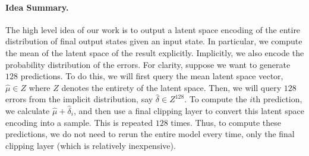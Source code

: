 \documentclass{article}
\begin{document}
\paragraph{Idea Summary.}
The high level idea of our work is to output a latent space encoding of the entire distribution of final output states given an input state. In particular, we compute the mean of the latent space of the result explicitly. Implicitly, we also encode the probability distribution of the errors. For clarity, suppose we want to generate $128$ predictions. To do this, we will first query the mean latent space vector, $\hat{\mu} \in Z$ where $Z$ denotes the entirety of the latent space. Then, we will query $128$ errors from the implicit distribution, say $\hat{\delta} \in Z^{128}$. To compute the $i$th prediction, we calculate $\hat{\mu} + \hat{\delta}_{i}$, and then use a final clipping layer to convert this latent space encoding into a sample. This is repeated $128$ times. Thus, to compute these predictions, we do not need to rerun the entire model every time, only the final clipping layer (which is relatively inexpensive).
\end{document}
